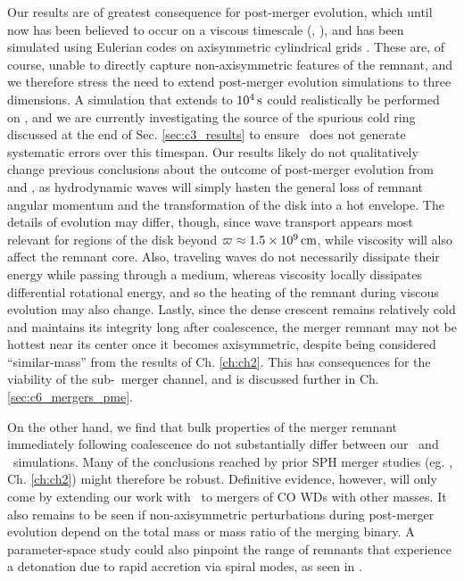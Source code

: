 Our results are of greatest consequence for post-merger evolution, which until now has been believed to occur on a viscous timescale (\citeal{vkercj10}, \citealt{shen+12}), and has been simulated using Eulerian codes on axisymmetric cylindrical grids \citep{schw+12,ji+13}.  These are, of course, unable to directly capture non-axisymmetric features of the remnant, and we therefore stress the need to extend post-merger evolution simulations to three dimensions.  A simulation that extends to $10^4\,\mathrm{s}$ could realistically be performed on \arepo, and we are currently investigating the source of the spurious cold ring discussed at the end of Sec. \ref{sec:c3_results} to ensure \arepo\ does not generate systematic errors over this timespan.  Our results likely do not qualitatively change previous conclusions about the outcome of post-merger evolution from \cite{schw+12} and \cite{ji+13}, as hydrodynamic waves will simply hasten the general loss of remnant angular momentum and the transformation of the disk into a hot envelope.  The details of evolution may differ, though, since wave transport appears most relevant for regions of the disk beyond $\varpi \approx 1.5\times10^9\,\mathrm{cm}$, while viscosity will also affect the remnant core.  Also, traveling waves do not necessarily dissipate their energy while passing through a medium, whereas viscosity locally dissipates differential rotational energy, and so the heating of the remnant during viscous evolution may also change.  Lastly, since the dense crescent remains relatively cold and maintains its integrity long after coalescence, the merger remnant may not be hottest near its center once it becomes axisymmetric, despite being considered ``similar-mass'' from the results of Ch. \ref{ch:ch2}.  This has consequences for the viability of the sub-\Mch\ merger channel, and is discussed further in Ch. \ref{sec:c6_mergers_pme}.

On the other hand, we find that bulk properties of the merger remnant immediately following coalescence do not substantially differ between our \gasoline\ and \arepo\ simulations.  Many of the conclusions reached by prior SPH merger studies (eg. \citeal{loreig09}, Ch. \ref{ch:ch2}) might therefore be robust.  Definitive evidence, however, will only come by extending our work with \arepo\ to mergers of CO WDs with other masses.  It also remains to be seen if non-axisymmetric perturbations during post-merger evolution depend on the total mass or mass ratio of the merging binary.  A parameter-space study could also pinpoint the range of remnants that experience a detonation due to rapid accretion via spiral modes, as seen in \cite{kash+15}.

